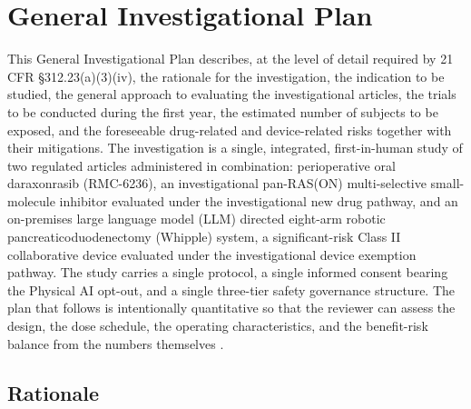 \section{General Investigational Plan}

This General Investigational Plan describes, at the level of detail required by
21 CFR \S 312.23(a)(3)(iv), the rationale for the investigation, the indication to
be studied, the general approach to evaluating the investigational articles, the
trials to be conducted during the first year, the estimated number of subjects to
be exposed, and the foreseeable drug-related and device-related risks together with
their mitigations. The investigation is a single, integrated, first-in-human study
of two regulated articles administered in combination: perioperative oral
daraxonrasib (RMC-6236), an investigational pan-RAS(ON) multi-selective
small-molecule inhibitor evaluated under the investigational new drug pathway, and
an on-premises large language model (LLM) directed eight-arm robotic
pancreaticoduodenectomy (Whipple) system, a significant-risk Class II collaborative
device evaluated under the investigational device exemption pathway. The study
carries a single protocol, a single informed consent bearing the Physical AI
opt-out, and a single three-tier safety governance structure. The plan that follows
is intentionally quantitative so that the reviewer can assess the design, the dose
schedule, the operating characteristics, and the benefit-risk balance from the
numbers themselves \cite{phase1guidance,daraxwhipple}.

\subsection{Rationale}

